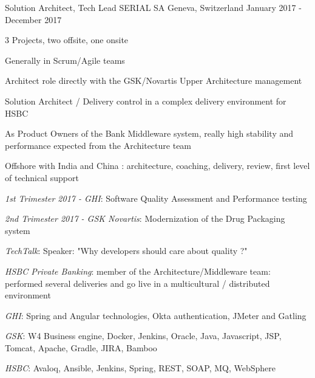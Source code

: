 \begin{cventries}
    \cventry
    {Solution Architect, Tech Lead} %
    {SERIAL SA} %
    {Geneva, Switzerland} %
    {January 2017 - December 2017} %
    {
        \experience
        {
            \begin{cvitems} %
                \item{3 Projects, two offsite, one onsite}
                \item{Generally in Scrum/Agile teams}
                \item{Architect role directly with the GSK/Novartis Upper Architecture management}
                \item{Solution Architect / Delivery control in a complex delivery environment for HSBC}
                \item{As Product Owners of the Bank Middleware system, really high stability and performance expected from the Architecture team}
                \item{Offshore with India and China : architecture, coaching, delivery, review, first level of technical support}
            \end{cvitems}
        }
        {
           \begin{cvitems} %
            \item{ \emph{1st Trimester 2017 - GHI}: Software Quality Assessment and Performance testing}
            \item{ \emph{2nd Trimester 2017 - GSK Novartis}: Modernization of the Drug Packaging system}
            \item{ \emph{TechTalk}: Speaker: "Why developers should care about quality ?"}
            \item{ \emph{HSBC Private Banking}: member of the Architecture/Middleware team: performed several deliveries and go live in a multicultural / distributed environment}              
           \end{cvitems}
        }
        {
            \begin{cvitems} %
                \item{\emph{GHI}: Spring and Angular technologies, Okta authentication, JMeter and Gatling}
                \item{\emph{GSK}: W4 Business engine, Docker, Jenkins, Oracle, Java, Javascript, JSP, Tomcat, Apache, Gradle, JIRA, Bamboo}
                \item{\emph{HSBC}: Avaloq, Ansible, Jenkins, Spring, REST, SOAP, MQ, WebSphere}
            \end{cvitems}
        }
    }


\end{cventries}
